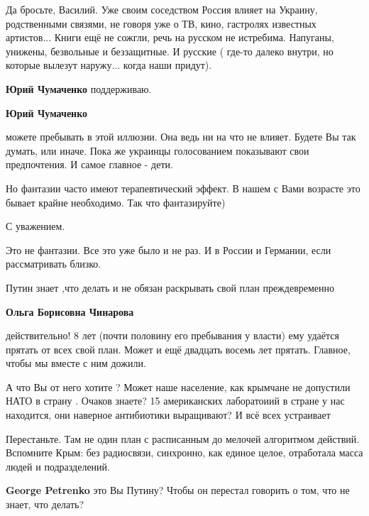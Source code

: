 \begin{itemize}
\begin{itemize}
Да бросьте, Василий. Уже своим соседством Россия влияет на Украину,
родственными связями, не говоря уже о ТВ, кино, гастролях известных артистов...
Книги ещё не сожгли, речь на русском не истребима. Напуганы, унижены,
безвольные и беззащитные. И русские ( где-то далеко внутри, но которые вылезут
наружу... когда наши придут).

\textbf{Юрий Чумаченко} поддерживаю.

\textbf{Юрий Чумаченко} 

можете пребывать в этой иллюзии. Она ведь ни на что не влияет. Будете Вы так
думать, или иначе. Пока же украинцы голосованием показывают свои предпочтения.
И самое главное - дети.

Но фантазии часто имеют терапевтический эффект. В нашем с Вами возрасте это бывает крайне необходимо. Так что фантазируйте)

С уважением.


Это не фантазии. Все это уже было и не раз. И в России и Германии, если рассматривать близко.


\end{itemize} %

Путин знает ,что делать и не обязан раскрывать свой план преждевременно

\begin{itemize} %
\textbf{Ольга Борисовна Чинарова} 

действительно! 8 лет (почти половину его пребывания у власти) ему удаётся
прятать от всех свой план. Может и ещё двадцать восемь лет прятать. Главное,
чтобы мы вместе с ним дожили.


А что Вы от него хотите ? Может наше население, как крымчане не допустили НАТО
в страну . Очаков знаете? 15 американских лаборатоиий в стране у нас находится,
они наверное антибиотики выращивают? И всё всех устраивает

\end{itemize} %


Перестаньте. Там не один план с расписанным до мелочей алгоритмом действий.
Вспомните Крым: без радиосвязи, синхронно, как единое целое, отработала масса
людей и подразделений.

\begin{itemize} %
\textbf{George Petrenko} это Вы Путину? Чтобы он перестал говорить о том, что не знает, что делать?


\end{itemize}
\end{itemize}
